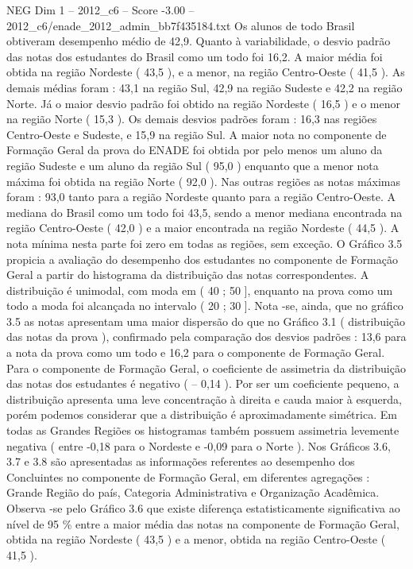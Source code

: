 \begin{textsample}{NEG Dim 1 – 2012\_c6 – Score -3.00 – 2012\_c6/enade\_2012\_admin\_bb7f435184.txt}
Os alunos de todo Brasil obtiveram desempenho médio de 42,9.
Quanto à variabilidade, o desvio padrão das notas dos estudantes do Brasil como um todo foi 16,2.
A maior média foi obtida na região Nordeste ( 43,5 ), e a menor, na região Centro-Oeste ( 41,5 ).
As demais médias foram : 43,1 na região Sul, 42,9 na região Sudeste e 42,2 na região Norte.
Já o maior desvio padrão foi obtido na região Nordeste ( 16,5 ) e o menor na região Norte ( 15,3 ).
Os demais desvios padrões foram : 16,3 nas regiões Centro-Oeste e Sudeste, e 15,9 na região Sul.
A maior nota no componente de Formação Geral da prova do ENADE foi obtida por pelo menos um aluno da região Sudeste e um aluno da região Sul ( 95,0 ) enquanto que a menor nota máxima foi obtida na região Norte ( 92,0 ).
Nas outras regiões as notas máximas foram : 93,0 tanto para a região Nordeste quanto para a região Centro-Oeste.
A mediana do Brasil como um todo foi 43,5, sendo a menor mediana encontrada na região Centro-Oeste ( 42,0 ) e a maior encontrada na região Nordeste ( 44,5 ).
A nota mínima nesta parte foi zero em todas as regiões, sem exceção.
O Gráfico 3.5 propicia a avaliação do desempenho dos estudantes no componente de Formação Geral a partir do histograma da distribuição das notas correspondentes.
A distribuição é unimodal, com moda em ( 40 ; 50 ], enquanto na prova como um todo a moda foi alcançada no intervalo ( 20 ; 30 ].
Nota -se, ainda, que no gráfico 3.5 as notas apresentam uma maior dispersão do que no Gráfico 3.1 ( distribuição das notas da prova ), confirmado pela comparação dos desvios padrões : 13,6 para a nota da prova como um todo e 16,2 para o componente de Formação Geral.
Para o componente de Formação Geral, o coeficiente de assimetria da distribuição das notas dos estudantes é negativo ( – 0,14 ).
Por ser um coeficiente pequeno, a distribuição apresenta uma leve concentração à direita e cauda maior à esquerda, porém podemos considerar que a distribuição é aproximadamente simétrica.
Em todas as Grandes Regiões os histogramas também possuem assimetria levemente negativa ( entre -0,18 para o Nordeste e -0,09 para o Norte ).
Nos Gráficos 3.6, 3.7 e 3.8 são apresentadas as informações referentes ao desempenho dos Concluintes no componente de Formação Geral, em diferentes agregações : Grande Região do país, Categoria Administrativa e Organização Acadêmica.
Observa -se pelo Gráfico 3.6 que existe diferença estatisticamente significativa ao nível de 95 \% entre a maior média das notas na componente de Formação Geral, obtida na região Nordeste ( 43,5 ) e a menor, obtida na região Centro-Oeste ( 41,5 ).

\end{textsample}
